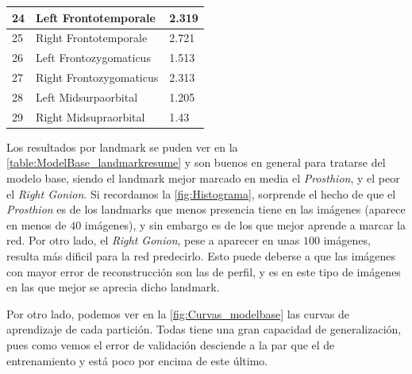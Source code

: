 \begin{table}[!ht]
\begin{tabular}{|l|l|l|}
                24 & Left Frontotemporale & 2.319 \\ \hline
                25 & Right Frontotemporale & 2.721 \\ \hline
                26 & Left Frontozygomaticus & 1.513 \\ \hline
                27 & Right Frontozygomaticus & 2.313 \\ \hline
                28 & Left Midsurpaorbital & 1.205 \\ \hline
                29 & Right Midsupraorbital & 1.43 \\ \hline
            \end{tabular}
            \label{table:ModelBase_landmarkresume}
        \end{table}

        \medskip

        \noindent Los resultados por landmark se puden ver en la \autoref{table:ModelBase_landmarkresume} y son buenos en general para tratarse del modelo base, siendo el landmark mejor marcado en media el \textit{Prosthion}, y el peor el \textit{Right Gonion}. Si recordamos la \autoref{fig:Histograma}, sorprende el hecho de que el \textit{Prosthion} es de los landmarks que menos presencia tiene en las imágenes (aparece en menos de $40$ imágenes), y sin embargo es de los que mejor aprende a marcar la red. Por otro lado, el \textit{Right Gonion}, pese a aparecer en unas $100$ imágenes, resulta más dificil para la red predecirlo. Esto puede deberse a que las imágenes con mayor error de reconstrucción son las de perfil, y es en este tipo de imágenes en las que mejor se aprecia dicho landmark.

        \medskip

        \noindent Por otro lado, podemos ver en la \autoref{fig:Curvas_modelbase} las curvas de aprendizaje de cada partición. Todas tiene una gran capacidad de generalización, pues como vemos el error de validación desciende a la par que el de entrenamiento y está poco por encima de este último.

